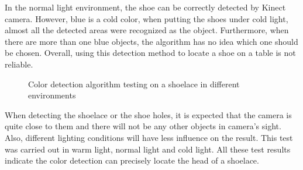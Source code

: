 In the normal light environment, the shoe can be correctly detected by Kinect camera. However, blue is a cold color, when putting the shoes under cold light, almost all the detected areas were recognized as the object. Furthermore, when there are more than one blue objects, the algorithm has no idea which one should be chosen. Overall, using this detection method to locate a shoe on a table is not reliable.
\begin{figure}[H]
\centering
%
%
%
\caption{Color detection algorithm testing on a shoelace in different environments}%
\label{shoelace}%
\end{figure}
When detecting the shoelace or the shoe holes, it is expected that the camera is quite close to them and there will not be any other objects in camera's sight. Also, different lighting conditions will have less influence on the result. This test was carried out in warm light, normal light and cold light. All these test results indicate the color detection can precisely locate the head of a shoelace. 

